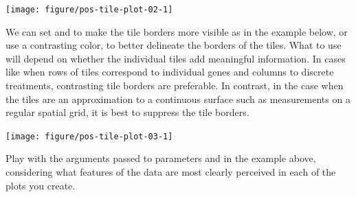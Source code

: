 \documentclass[krantz2]{krantz}\usepackage{knitr}%
\begin{document}
\begin{knitrout}\footnotesize
{}\color{fgcolor}\begin{kframe}
\begin{alltt}
    \hlopt{+}
  \hlstd{()}
\end{alltt}
\end{kframe}

{\centering \texttt{[image: figure/pos-tile-plot-02-1]} 

}



\end{knitrout}

We can set  and  to make the tile borders more visible as in the example below, or use a contrasting color, to better delineate the borders of the tiles. What to use will depend on whether the individual tiles add meaningful information. In cases like when rows of tiles correspond to individual genes and columns to discrete treatments, contrasting tile borders are preferable. In contrast, in the case when the tiles are an approximation to a continuous surface such as measurements on a regular spatial grid, it is best to suppress the tile borders.

\begin{knitrout}\footnotesize
{}\color{fgcolor}\begin{kframe}
\begin{alltt}
    \hlopt{+}
  \hlstd{(} \hlstd{=} \hlstd{,}  \hlstd{=} \hlstd{)}
\end{alltt}
\end{kframe}

{\centering \texttt{[image: figure/pos-tile-plot-03-1]} 

}



\end{knitrout}

\begin{playground}
Play with the arguments passed to parameters  and  in the example above, considering what features of the data are most clearly perceived in each of the plots you create.
\end{playground}
\end{document}
